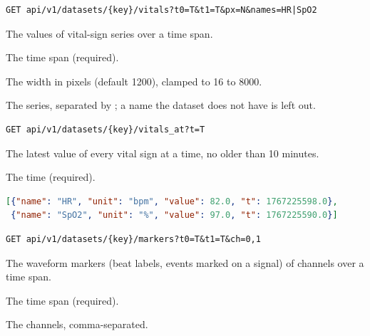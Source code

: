 \begin{lstlisting}[style=signature]
GET api/v1/datasets/{key}/vitals?t0=T&t1=T&px=N&names=HR|SpO2
\end{lstlisting}
The values of vital-sign series over a time span.
\begin{params}
\item[t0, t1] The time span (required).
\item[px] The width in pixels (default 1200), clamped to 16 to 8000.
\item[names] The series, separated by \code{\textbar}; a name the dataset does not have is left
  out.
\end{params}

\begin{lstlisting}[style=signature]
GET api/v1/datasets/{key}/vitals_at?t=T
\end{lstlisting}
The latest value of every vital sign at a time, no older than 10 minutes.
\begin{params}
\item[t] The time (required).
\end{params}
\begin{lstlisting}[language=JSON]
[{"name": "HR", "unit": "bpm", "value": 82.0, "t": 1767225598.0},
 {"name": "SpO2", "unit": "%", "value": 97.0, "t": 1767225590.0}]
\end{lstlisting}

\begin{lstlisting}[style=signature]
GET api/v1/datasets/{key}/markers?t0=T&t1=T&ch=0,1
\end{lstlisting}
The waveform markers (beat labels, events marked on a signal) of channels over a time span.
\begin{params}
\item[t0, t1] The time span (required).
\item[ch] The channels, comma-separated.
\end{params}

